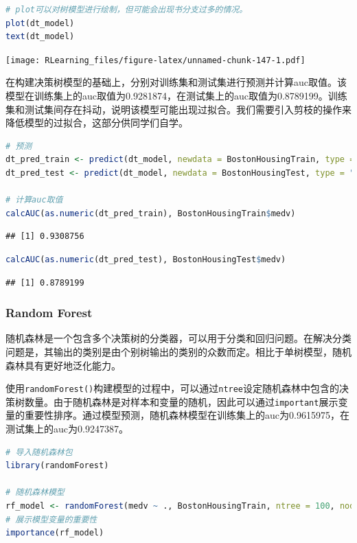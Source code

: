 \documentclass[]{ctexbook}
\newcommand{\passthrough}[1]{#1}
\begin{document}
\begin{lstlisting}[language=R]
# plot可以对树模型进行绘制，但可能会出现书分支过多的情况。
plot(dt_model)
text(dt_model)
\end{lstlisting}

\texttt{[image: RLearning\_files/figure-latex/unnamed-chunk-147-1.pdf]}

在构建决策树模型的基础上，分别对训练集和测试集进行预测并计算auc取值。该模型在训练集上的auc取值为0.9281874，在测试集上的auc取值为0.8789199。训练集和测试集间存在抖动，说明该模型可能出现过拟合。我们需要引入剪枝的操作来降低模型的过拟合，这部分供同学们自学。

\begin{lstlisting}[language=R]
# 预测
dt_pred_train <- predict(dt_model, newdata = BostonHousingTrain, type = "class")
dt_pred_test <- predict(dt_model, newdata = BostonHousingTest, type = "class")

# 计算auc取值
calcAUC(as.numeric(dt_pred_train), BostonHousingTrain$medv)
\end{lstlisting}

\begin{lstlisting}
## [1] 0.9308756
\end{lstlisting}

\begin{lstlisting}[language=R]
calcAUC(as.numeric(dt_pred_test), BostonHousingTest$medv)
\end{lstlisting}

\begin{lstlisting}
## [1] 0.8789199
\end{lstlisting}

\hypertarget{random-forest}{%
\subsubsection{Random Forest}\label{random-forest}}

随机森林是一个包含多个决策树的分类器，可以用于分类和回归问题。在解决分类问题是，其输出的类别是由个别树输出的类别的众数而定。相比于单树模型，随机森林具有更好地泛化能力。

使用\passthrough{\lstinline!randomForest()!}构建模型的过程中，可以通过\passthrough{\lstinline!ntree!}设定随机森林中包含的决策树数量。由于随机森林是对样本和变量的随机，因此可以通过\passthrough{\lstinline!important!}展示变量的重要性排序。通过模型预测，随机森林模型在训练集上的auc为0.9615975，在测试集上的auc为0.9247387。

\begin{lstlisting}[language=R]
# 导入随机森林包
library(randomForest)

# 随机森林模型
rf_model <- randomForest(medv ~ ., BostonHousingTrain, ntree = 100, nodesize = 10, importance = T)
# 展示模型变量的重要性
importance(rf_model)
\end{lstlisting}
\end{document}
